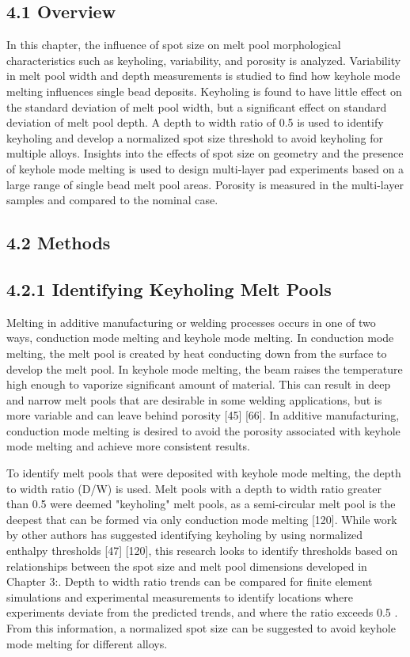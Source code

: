 \documentclass[10pt]{article}
\begin{document}
\subsection*{4.1 Overview}
In this chapter, the influence of spot size on melt pool morphological characteristics such as keyholing, variability, and porosity is analyzed. Variability in melt pool width and depth measurements is studied to find how keyhole mode melting influences single bead deposits. Keyholing is found to have little effect on the standard deviation of melt pool width, but a significant effect on standard deviation of melt pool depth. A depth to width ratio of 0.5 is used to identify keyholing and develop a normalized spot size threshold to avoid keyholing for multiple alloys. Insights into the effects of spot size on geometry and the presence of keyhole mode melting is used to design multi-layer pad experiments based on a large range of single bead melt pool areas. Porosity is measured in the multi-layer samples and compared to the nominal case.

\subsection*{4.2 Methods}
\subsection*{4.2.1 Identifying Keyholing Melt Pools}
Melting in additive manufacturing or welding processes occurs in one of two ways, conduction mode melting and keyhole mode melting. In conduction mode melting, the melt pool is created by heat conducting down from the surface to develop the melt pool. In keyhole mode melting, the beam raises the temperature high enough to vaporize significant amount of material. This can result in deep and narrow melt pools that are desirable in some welding applications, but is more variable and can leave behind porosity [45] [66]. In additive manufacturing, conduction mode melting is desired to avoid the porosity associated with keyhole mode melting and achieve more consistent results.

To identify melt pools that were deposited with keyhole mode melting, the depth to width ratio (D/W) is used. Melt pools with a depth to width ratio greater than 0.5 were deemed "keyholing" melt pools, as a semi-circular melt pool is the deepest that can be formed via only conduction mode melting [120]. While work by other authors has suggested identifying keyholing by using normalized enthalpy thresholds [47] [120], this research looks to identify thresholds based on relationships between the spot size and melt pool dimensions developed in Chapter 3:. Depth to width ratio trends can be compared for finite element simulations and experimental measurements to identify locations where experiments deviate from the predicted trends, and where the ratio exceeds 0.5 . From this information, a normalized spot size can be suggested to avoid keyhole mode melting for different alloys.
\end{document}
